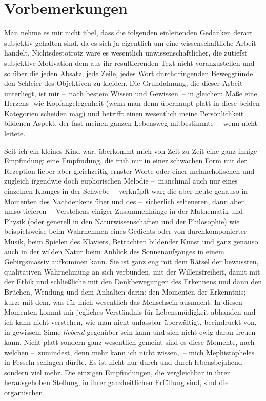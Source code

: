 \chapter*{Vorbemerkungen}\label{ch:introduction}

Man nehme es mir nicht übel, dass die folgenden einleitenden Gedanken derart
  subjektiv gehalten sind, da es sich ja eigentlich um eine wissenschaftliche Arbeit
  handelt.
Nichtsdestotrotz wäre es wesentlich unwissenschaftlicher, die zutiefst
  subjektive Motivation dem aus ihr resultierenden Text nicht voranzustellen
  und so über die jeden Absatz, jede Zeile, jedes Wort durchdringenden
  Beweggründe den Schleier des Objektiven zu kleiden.
Die Grundahnung, die dieser Arbeit unterliegt, ist mir --~nach bestem Wissen
  und Gewissen~-- in gleichem Maße eine Herzens- wie Kopfangelegenheit (wenn
  man denn überhaupt platt in diese beiden Kategorien scheiden mag)
  und betrifft einen wesentlich meine Persönlichkeit bildenen 
  Aspekt, der fast meinen ganzen Lebensweg mitbestimmte --~wenn nicht leitete.

Seit ich ein kleines Kind war, überkommt mich von Zeit zu Zeit eine ganz
  innige Empfindung; eine Empfindung, die früh nur in einer schwachen Form 
  mit der Rezeption lieber aber gleichzeitig ernster Worte oder einer
  melancholischen und zugleich irgendwie doch euphorischen Melodie --~manchmal
  auch nur eines einzelnen Klanges in der Schwebe~-- verknüpft war;
  die aber heute genauso in Momenten des Nachdenkens über und des
  --~sicherlich selteneren, dann aber umso tieferen~-- Verstehens einiger
  Zusammenhänge in der Mathematik und Physik (oder generell in den
  Naturwissenschaften und der Philosophie) wie beispielsweise beim Wahrnehmen eines Gedichts
  oder von durchkomponierter Musik, beim Spielen des Klaviers, Betrachten
  bildender Kunst und ganz genauso auch in der wilden Natur beim Anblick des
  Sonnenaufganges in einem Gebirgsmassiv aufkommen kann.
Sie ist ganz eng mit dem Rätsel der bewussten, qualitativen Wahrnehmung an sich
  verbunden, mit der Willensfreiheit, damit mit der Ethik und schließliche mit
  den Denkbewegungen des Erkennens und dann den Brüchen, Wendung und dem
  Anhalten darin: den Momenten der Erkenntnis; kurz: mit dem, was für mich
  wesentlich das Menschsein ausmacht.
In diesen Momenten kommt mir jegliches Verständnis für Lebensmüdigkeit
  abhanden und ich kann nicht verstehen, wie man nicht unfassbar überwältigt,
  beeindruckt von, in gewissem Sinne \emph{liebend}  gegenüber sein
  kann und sich nicht ewig daran freuen kann.
Nicht platt sondern ganz wesentlich gemeint sind es diese Momente, nach welchen
  --~zumindest, denn mehr kann ich nicht wissen,~-- mich Mephistopheles in
  Fesseln schlagen dürfte.
Es ist nicht nur durch und durch lebensbejahend sondern viel mehr.
Die einzigen Empfindungen, die vergleichbar in ihrer herausgehoben Stellung,
  in ihrer ganzheitlichen Erfüllung sind, sind die orgamischen.

